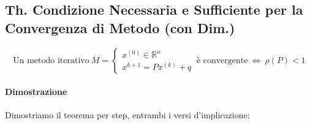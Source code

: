 \documentclass{article}
\begin{document}
\subsection{Th. Condizione Necessaria e Sufficiente per la Convergenza di Metodo (con Dim.)}

\vspace*{12px}

\[ \text{Un metodo iterativo} \: M = \left\{ \begin{array}{lll}
    x^{(0)} \in \mathbb{R}^{n} \\ 
    x^{k+1} = Px^{(k)} + q 
    \end{array}\right.
    \: \text{è convergente} \:
    \Longleftrightarrow
    \:
    \rho(P) < 1
\]

\paragraph{Dimostrazione} Dimostriamo il teorema per step, entrambi i versi d'implicazione:
\end{document}
